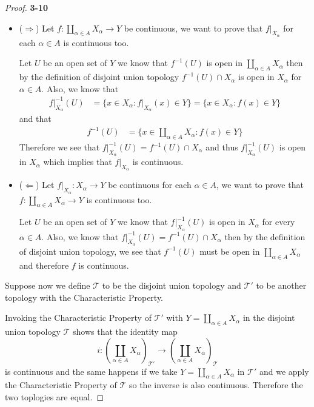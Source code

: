 \documentclass[11pt]{article}
\newcommand{\Topo}{\mathcal{T}}
\theoremstyle{definition}
\begin{document}
\cleardoublepage
\begin{proof}{\textbf{3-10}}
    \begin{itemize}
        \item[]
        ($\Rightarrow$) Let $f: \coprod_{\alpha \in A} X_\alpha \to Y$
        be continuous, we want to prove that $f|_{X_\alpha}$ for
        each $\alpha \in A$ is continuous too.
    
        Let $U$ be an open set of $Y$ we know that $f^{-1}(U)$ is open in
        $\coprod_{\alpha \in A} X_\alpha$ then by the definition of disjoint
        union topology $f^{-1}(U) \cap X_\alpha$ is open in $X_\alpha$
        for $\alpha \in A$. Also, we know that
        \begin{align*}
            f|_{X_\alpha}^{-1}(U) 
            &= \{x \in X_\alpha : f|_{X_\alpha}(x) \in Y\}
            = \{x \in X_\alpha : f(x) \in Y\}
        \end{align*}
        and that
        \begin{align*}
            f^{-1}(U) 
            &= \{x \in \coprod_{\alpha \in A} X_\alpha : f(x) \in Y\}
        \end{align*}
        Therefore we see that $f|_{X_\alpha}^{-1}(U) = f^{-1}(U) \cap X_\alpha$
        and thus $f|_{X_\alpha}^{-1}(U)$ is open in $X_\alpha$
        which implies that $f|_{X_\alpha}$ is continuous.

        \item[]
        ($\Leftarrow$) Let $f|_{X_\alpha}: X_\alpha \to Y$
        be continuous for each $\alpha \in A$, we want to prove that
        $f: \coprod_{\alpha \in A} X_\alpha \to Y$ is continuous too.

        Let $U$ be an open set of $Y$ we know that $f|_{X_\alpha}^{-1}(U)$
        is open in $X_\alpha$ for every $\alpha \in A$.
        Also, we know that $f|_{X_\alpha}^{-1}(U) = f^{-1}(U) \cap X_\alpha$
        then by the definition of disjoint union topology, we see that
        $f^{-1}(U)$ must be open in $\coprod_{\alpha \in A} X_\alpha$
        and therefore $f$ is continuous.
    \end{itemize}
    Suppose now we define $\Topo$ to be the disjoint union topology and
    $\Topo'$ to be another topology with the Characteristic Property.

    Invoking the Characteristic Property of $\Topo'$ with
    $Y = \coprod_{\alpha \in A} X_\alpha$ in the disjoint union topology
    $\Topo$ shows that the identity map
    $$i: (\coprod_{\alpha \in A} X_\alpha)_{\Topo'}
    \to (\coprod_{\alpha \in A} X_\alpha)_\Topo$$
    is continuous and the same happens if we take 
    $Y = \coprod_{\alpha \in A} X_\alpha$ in $\Topo'$ and we apply the 
    Characteristic Property of $\Topo$ so the inverse is also continuous.
    Therefore the two toplogies are equal.
\end{proof}
\end{document}

